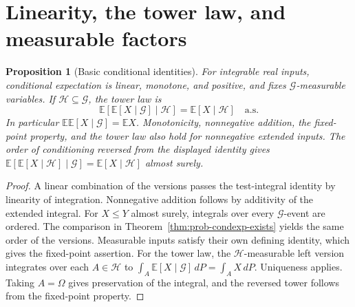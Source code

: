 \documentclass[11pt,oneside,openany]{book}
\theoremstyle{plain}
\newtheorem{proposition}[theorem]{Proposition}
\theoremstyle{definition}
\theoremstyle{remark}
\begin{document}
\section{Linearity, the tower law, and measurable factors}
\label{p03-02}

\begin{proposition}[Basic conditional identities]
\label{thm:prob-condexp-laws}
For integrable real inputs, conditional expectation is linear,
monotone, and positive, and fixes \(\mathcal G\)-measurable
variables. If \(\mathcal H\subseteq\mathcal G\), the tower law is
\[
 \mathbb E[\mathbb E[X\mid\mathcal G]\mid\mathcal H]
 =\mathbb E[X\mid\mathcal H]\quad\text{a.s.}
\]
In particular \(\mathbb E\mathbb E[X\mid\mathcal G]=\mathbb E X\).
Monotonicity, nonnegative addition, the fixed-point property,
and the tower law also hold for nonnegative extended inputs.
The order of conditioning reversed from the displayed identity
gives \(\mathbb E[\mathbb E[X\mid\mathcal H]\mid\mathcal G]
=\mathbb E[X\mid\mathcal H]\) almost surely.
\end{proposition}
\begin{proof}
A linear combination of the versions passes the test-integral
identity by linearity of integration. Nonnegative addition follows
by additivity of the extended integral. For \(X\le Y\) almost
surely, integrals over every \(\mathcal G\)-event are ordered.
The comparison in Theorem~\ref{thm:prob-condexp-exists} yields
the same order of the versions. Measurable inputs satisfy their
own defining identity, which gives the fixed-point assertion.
For the tower law, the \(\mathcal H\)-measurable left version
integrates over each \(A\in\mathcal H\) to
\(\int_A\mathbb E[X\mid\mathcal G]\,dP=\int_A X\,dP\).
Uniqueness applies. Taking \(A=\Omega\) gives preservation of
the integral, and the reversed tower follows from the
fixed-point property.
\end{proof}
\end{document}
